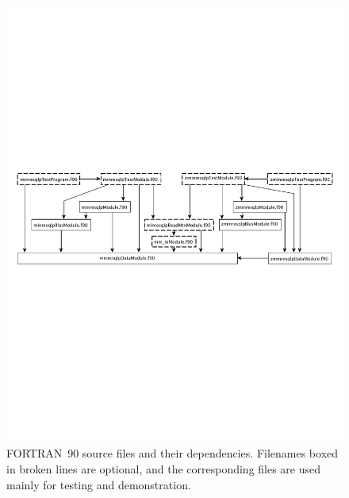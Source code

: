 \documentclass{doc_acmtrans2m}
\begin{document}
\begin{figure}[ht]   %
\centering
\includegraphics[scale=.6]{f90-program-real-complex-units.pdf}
\caption{FORTRAN~90 source files and their dependencies. Filenames
  boxed in broken lines are optional, and the corresponding files are
  used mainly for testing and demonstration.}
\label{fig:f90-program-units}
\end{figure}
\end{document}
